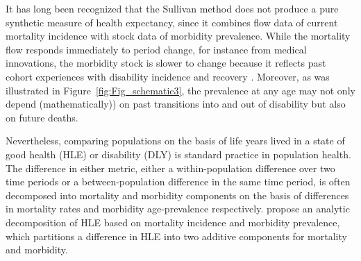\documentclass[11pt,oneside,a4paper]{article} %
\newcommand{\tc}{\quad\quad\text{,}}
\begin{document}
It has long been recognized that the Sullivan method does not produce a pure
synthetic measure of health expectancy, since it combines flow data of current
mortality incidence with stock data of morbidity prevalence. While the mortality
flow responds immediately to period change, for instance from medical
innovations, the morbidity stock is slower to change because it reflects past
cohort experiences with disability incidence and recovery
\citep{Mathers1997,Barendregt1994}. Moreover, as was illustrated in
Figure~\ref{fig:Fig_schematic3}, the prevalence at any age may not only depend
(mathematically)) on past transitions into and out of disability but also on
future deaths.

Nevertheless, comparing populations on the basis of life years lived in a state
of good health (HLE) or disability (DLY) is standard practice in population
health. The difference in either metric, either a within-population difference
over two time periods or a between-population difference in the same time
period, is often decomposed into mortality and morbidity components on the basis
of differences in mortality rates and morbidity age-prevalence respectively.
\citet{Andreev2002} propose an analytic decomposition of HLE based on mortality
incidence and morbidity prevalence, which partitions a difference in HLE into
two additive components for mortality and morbidity.
\end{document}
